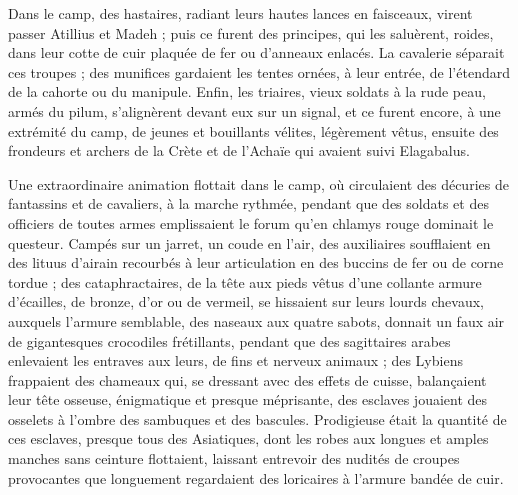 \documentclass[a4paper, 11pt, oneside, polutonikogreek, french]{article}
\begin{document}
Dans le camp, des hastaires, radiant leurs hautes lances en faisceaux, virent passer Atillius et Madeh ; puis ce furent des principes, qui les saluèrent, roides, dans leur cotte de cuir plaquée de fer ou d'anneaux enlacés. La cavalerie séparait ces troupes ; des munifices gardaient les tentes ornées, à leur entrée, de l'étendard de la cahorte ou du manipule. Enfin, les triaires, vieux soldats à la rude peau, armés du pilum, s'alignèrent devant eux sur un signal, et ce furent encore, à une extrémité du camp, de jeunes et bouillants vélites, légèrement vêtus, ensuite des frondeurs et archers de la Crète et de l'Achaïe qui avaient suivi Elagabalus.

Une extraordinaire animation flottait dans le camp, où circulaient des décuries de fantassins et de cavaliers, à la marche rythmée, pendant que des soldats et des officiers de toutes armes emplissaient le forum qu'en chlamys rouge dominait le questeur. Campés sur un jarret, un coude en l'air, des auxiliaires soufflaient en des lituus d'airain recourbés à leur articulation en des buccins de fer ou de corne tordue ; des cataphractaires, de la tête aux pieds vêtus d'une collante armure d'écailles, de bronze, d'or ou de vermeil, se hissaient sur leurs lourds chevaux, auxquels l'armure semblable, des naseaux aux quatre sabots, donnait un faux air de gigantesques crocodiles frétillants, pendant que des sagittaires arabes enlevaient les entraves aux leurs, de fins et nerveux animaux ; des Lybiens frappaient des chameaux qui, se dressant avec des effets de cuisse, balançaient leur tête osseuse, énigmatique et presque méprisante, des esclaves jouaient des osselets à l'ombre des sambuques et des bascules. Prodigieuse était la quantité de ces esclaves, presque tous des Asiatiques, dont les robes aux longues et amples manches sans ceinture flottaient, laissant entrevoir des nudités de croupes provocantes que longuement regardaient des loricaires à l'armure bandée de cuir.
\end{document}
